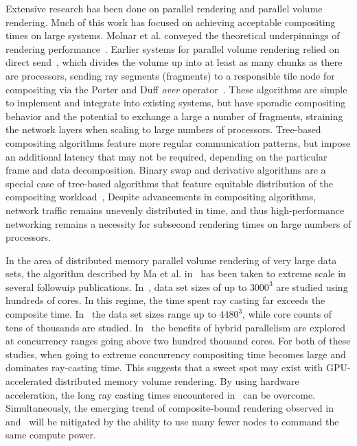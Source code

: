 Extensive research has been done on parallel rendering and parallel
volume rendering.  Much of this work has focused on achieving
acceptable compositing times on large systems.  Molnar et al. conveyed
the theoretical underpinnings of rendering
performance~\cite{Molnar:1994:ParRen}.  Earlier systems for parallel
volume rendering relied on direct send~\cite{Hsu:1993:SRC,
Ma:1993:DSend}, which divides the volume up into at least as many
chunks as there are processors, sending ray segments (fragments) to a
responsible tile node for compositing via the Porter and Duff
\emph{over} operator~\cite{PorterDuff:1984:Compositing}.  These
algorithms are simple to implement and integrate into existing systems,
but have sporadic compositing behavior and the potential to exchange a
large a number of fragments, straining the network layers when scaling
to large numbers of processors.  Tree-based compositing algorithms
feature more regular communication patterns, but impose an additional
latency that may not be required, depending on the particular frame
and data decomposition.  Binary swap and derivative algorithms are a
special case of tree-based algorithms that feature
equitable distribution of the compositing
workload~\cite{Ma:1994:BinarySwap}, Despite advancements in compositing
algorithms, network traffic remains unevenly distributed in time, and
thus high-performance networking remains a necessity for subsecond
rendering times on large numbers of processors.

In the area of distributed memory parallel volume rendering of very
large data sets, the algorithm described by Ma et al.
in~\cite{Ma:1993:DSend} has been taken to extreme scale in several
followuip publications.  In~\cite{Childs:2006:ScalableVR}, data set
sizes of up to $3000^3$ are studied using hundreds of cores.  In this
regime, the time spent ray casting far exceeds the composite time.
In~\cite{Peterka:2008:VolRenBGP, Peterka:2009:ETES} the data set sizes
range up to $4480^3$, while core counts of tens of thousands are
studied.
In~\cite{Howison:2010:HybridVR} the benefits of hybrid parallelism
are explored at concurrency ranges going above two hundred thousand
cores.  For both of these studies, when going to extreme concurrency
compositing time becomes large and dominates ray-casting time.  This
suggests that a sweet spot may exist with GPU-accelerated distributed
memory volume rendering.  By using hardware acceleration, the long ray
casting times encountered in~\cite{Childs:2006:ScalableVR} can be
overcome.  Simultaneously, the emerging trend of composite-bound
rendering
observed in~\cite{Peterka:2009:ETES} and~\cite{Howison:2010:HybridVR}
will be mitigated by the ability to use many fewer nodes to command the
same compute power.

